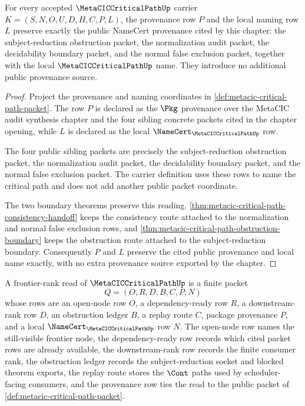 \begin{theorem}
\label{thm:metacic-critical-path-provenance-naming}
For every accepted $\MetaCICCriticalPathUp$ carrier $K=(S,N,O,U,D,H,C,P,L)$, the provenance row $P$ and the local naming row $L$ preserve exactly the public NameCert provenance cited by this chapter: the subject-reduction obstruction packet, the normalization audit packet, the decidability boundary packet, and the normal false exclusion packet, together with the local $\MetaCICCriticalPathUp$ name. They introduce no additional public provenance source.
\end{theorem}
\begin{proof}
Project the provenance and naming coordinates in \autoref{def:metacic-critical-path-packet}. The row $P$ is declared as the $\Pkg$ provenance over the MetaCIC audit synthesis chapter and the four sibling concrete packets cited in the chapter opening, while $L$ is declared as the local $\NameCert_{\MetaCICCriticalPathUp}$ row.

The four public sibling packets are precisely the subject-reduction obstruction packet, the normalization audit packet, the decidability boundary packet, and the normal false exclusion packet. The carrier definition uses these rows to name the critical path and does not add another public packet coordinate.

The two boundary theorems preserve this reading. \autoref{thm:metacic-critical-path-consistency-handoff} keeps the consistency route attached to the normalization and normal false exclusion rows, and \autoref{thm:metacic-critical-path-obstruction-boundary} keeps the obstruction route attached to the subject-reduction boundary. Consequently $P$ and $L$ preserve the cited public provenance and local name exactly, with no extra provenance source exported by the chapter.
\end{proof}

\begin{definition}
\label{def:metacic-critical-path-frontier-rank-carrier}
A frontier-rank read of $\MetaCICCriticalPathUp$ is a finite packet
$$
Q=(O,R,D,B,C,P,N)
$$
whose rows are an open-node row $O$, a dependency-ready row $R$, a downstream-rank row $D$, an obstruction ledger $B$, a replay route $C$, package provenance $P$, and a local $\NameCert_{\MetaCICCriticalPathUp}$ row $N$. The open-node row names the still-visible frontier node, the dependency-ready row records which cited packet rows are already available, the downstream-rank row records the finite consumer rank, the obstruction ledger records the subject-reduction socket and blocked theorem exports, the replay route stores the $\Cont$ paths used by scheduler-facing consumers, and the provenance row ties the read to the public packet of \autoref{def:metacic-critical-path-packet}.
\end{definition}

